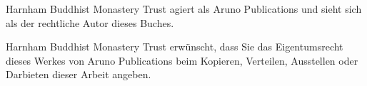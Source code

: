 {Harnham Buddhist Monastery Trust agiert als Aruno Publications und sieht sich als der rechtliche Autor dieses Buches. 

Harnham Buddhist Monastery Trust erwünscht, dass Sie das Eigentumsrecht dieses Werkes von Aruno Publications beim Kopieren, Verteilen, Ausstellen oder Darbieten dieser Arbeit angeben.

}
